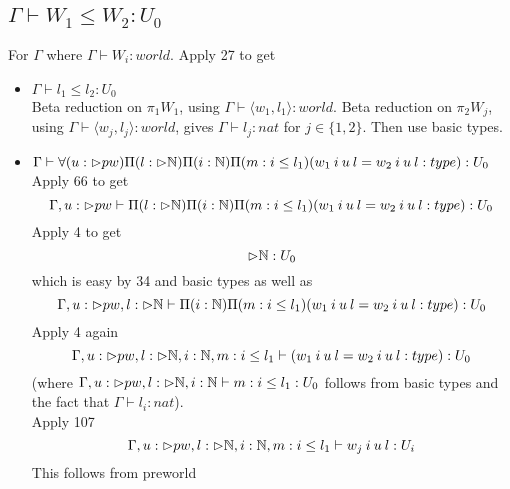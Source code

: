 \documentclass{article}
\begin{document}
\subsection*{$\Gamma \vdash W_1 \leq W_2:U_0$}
For $\Gamma$ where $\Gamma \vdash W_i: world$.
Apply 27 to get
\begin{itemize}
    \item $\Gamma \vdash l_1 \leq l_2 : U_0$\\
      Beta reduction on $\pi_1 W_1$, using $\Gamma \vdash \langle w_1, l_1 \rangle : world$.
         Beta reduction on $\pi_2 W_j$, using $\Gamma \vdash \langle w_j, l_j \rangle : world$, gives
    $\Gamma \vdash l_j: nat$ for $j \in \{1, 2\}$. Then use basic types. 
    \item $\Gamma \vdash \forall(u: \rhd pw)\Pi(l: \rhd \mathbb{N})\Pi(i: \mathbb{N})\Pi(m : i \leq l_1)(w_1 \: i \: u \: l = w_2 \: i \: u \: l : type): U_0$\\
    Apply 66 to get 
    \[\Gamma, u: \rhd pw \vdash \Pi(l: \rhd \mathbb{N})\Pi(i: \mathbb{N})\Pi(m : i \leq l_1)(w_1 \: i \: u \: l = w_2 \: i \: u \: l : type): U_0\]
    Apply 4 to get 
    \[\rhd \mathbb{N}: U_0\] which is easy by 34 and basic types
    as well as
    \[\Gamma, u: \rhd pw , l : \rhd \mathbb{N} \vdash \Pi(i: \mathbb{N})\Pi(m : i \leq l_1)(w_1 \: i \: u \: l = w_2 \: i \: u \: l : type): U_0\]
Apply 4 again 
    \[\Gamma, u: \rhd pw , l : \rhd \mathbb{N}, i: \mathbb{N}, m: i \leq l_1 \vdash (w_1 \: i \: u \: l = w_2 \: i \: u \: l : type): U_0\]
    (where $\Gamma, u: \rhd pw , l : \rhd \mathbb{N}, i: \mathbb{N} \vdash m: i \leq l_1 : U_0$ follows from basic types and the fact that $\Gamma \vdash l_i: nat$).\\
    Apply 107 
    \[\Gamma, u: \rhd pw , l : \rhd \mathbb{N}, i: \mathbb{N}, m: i \leq l_1 \vdash w_j \: i \: u \: l : U_i\]
    This follows from preworld

\end{itemize}
\end{document}
